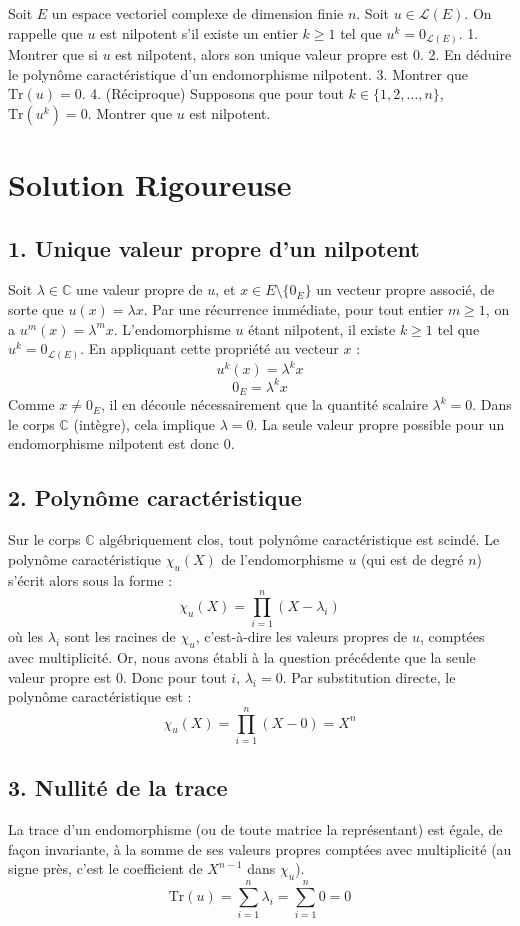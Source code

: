 \documentclass[11pt,a4paper]{article}
\begin{document}
Soit $E$ un espace vectoriel complexe de dimension finie $n$. Soit $u \in \mathcal{L}(E)$.
On rappelle que $u$ est nilpotent s'il existe un entier $k \ge 1$ tel que $u^k = 0_{\mathcal{L}(E)}$.
1. Montrer que si $u$ est nilpotent, alors son unique valeur propre est 0.
2. En déduire le polynôme caractéristique d'un endomorphisme nilpotent.
3. Montrer que $\text{Tr}(u) = 0$.
4. (Réciproque) Supposons que pour tout $k \in \{1, 2, \dots, n\}$, $\text{Tr}(u^k) = 0$. Montrer que $u$ est nilpotent.

\section{Solution Rigoureuse}

\subsection{1. Unique valeur propre d'un nilpotent}
Soit $\lambda \in \mathbb{C}$ une valeur propre de $u$, et $x \in E \setminus \{0_E\}$ un vecteur propre associé, de sorte que $u(x) = \lambda x$.
Par une récurrence immédiate, pour tout entier $m \ge 1$, on a $u^m(x) = \lambda^m x$.
L'endomorphisme $u$ étant nilpotent, il existe $k \ge 1$ tel que $u^k = 0_{\mathcal{L}(E)}$.
En appliquant cette propriété au vecteur $x$ :
$$u^k(x) = \lambda^k x$$
$$0_E = \lambda^k x$$
Comme $x \neq 0_E$, il en découle nécessairement que la quantité scalaire $\lambda^k = 0$.
Dans le corps $\mathbb{C}$ (intègre), cela implique $\lambda = 0$.
La seule valeur propre possible pour un endomorphisme nilpotent est donc $0$.

\subsection{2. Polynôme caractéristique}
Sur le corps $\mathbb{C}$ algébriquement clos, tout polynôme caractéristique est scindé.
Le polynôme caractéristique $\chi_u(X)$ de l'endomorphisme $u$ (qui est de degré $n$) s'écrit alors sous la forme :
$$\chi_u(X) = \prod_{i=1}^n (X - \lambda_i)$$
où les $\lambda_i$ sont les racines de $\chi_u$, c'est-à-dire les valeurs propres de $u$, comptées avec multiplicité.
Or, nous avons établi à la question précédente que la seule valeur propre est 0. Donc pour tout $i$, $\lambda_i = 0$.
Par substitution directe, le polynôme caractéristique est :
$$\chi_u(X) = \prod_{i=1}^n (X - 0) = X^n$$

\subsection{3. Nullité de la trace}
La trace d'un endomorphisme (ou de toute matrice la représentant) est égale, de façon invariante, à la somme de ses valeurs propres comptées avec multiplicité (au signe près, c'est le coefficient de $X^{n-1}$ dans $\chi_u$).
$$\text{Tr}(u) = \sum_{i=1}^n \lambda_i = \sum_{i=1}^n 0 = 0$$
\end{document}
